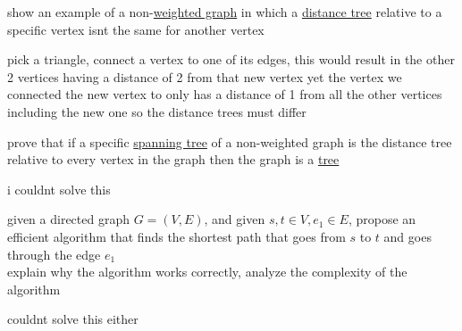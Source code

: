 \documentclass[a4paper,12pt]{article}
\begin{document}
\begin{question}
\begin{subquestion}
show an example of a non-\href{20230412150436-weighted_graph.org}{weighted graph} in which a \href{20230415232312-shortest_path_tree.org}{distance tree} relative to a specific vertex isnt the same for another vertex\\
\begin{answer}
pick a triangle, connect a vertex to one of its edges, this would result in the other 2 vertices having a distance of 2 from that new vertex yet the vertex we connected the new vertex to only has a distance of 1 from all the other vertices including the new one so the distance trees must differ\\
\end{answer}
\end{subquestion}
\begin{subquestion}
prove that if a specific \href{20230415231645-spanning_tree.org}{spanning tree} of a non-weighted graph is the distance tree relative to every vertex in the graph then the graph is a \href{20230323170647-tree.org}{tree}\\
\begin{answer}
i couldnt solve this\\
\end{answer}
\end{subquestion}
\end{question}
\begin{question}
given a directed graph \(G=(V,E)\), and given \(s,t \in V, e_1 \in E\), propose an efficient algorithm that finds the shortest path that goes from \(s\) to \(t\) and goes through the edge \(e_1\)\\
explain why the algorithm works correctly, analyze the complexity of the algorithm\\
\begin{answer}
couldnt solve this either\\
\end{answer}
\end{question}
\end{document}
